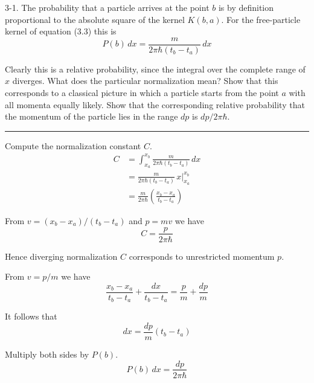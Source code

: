 \documentclass[12pt]{article}
\begin{document}
3-1.
The probability that a particle arrives at the point $b$
is by definition proportional to the absolute square of the kernel
$K(b,a)$.
For the free-particle kernel of equation (3.3) this is
\begin{equation*}
P(b)\,dx=\frac{m}{2\pi\hbar(t_b-t_a)}\,dx
\tag{3.6}
\end{equation*}

Clearly this is a relative probability, since the integral over the
complete range of $x$ diverges.
What does the particular normalization mean?
Show that this corresponds to a classical picture in which a particle
starts from the point $a$ with all momenta equally likely.
Show that the corresponding relative probability that the momentum
of the particle lies in the range $dp$ is $dp/2\pi\hbar$.

\bigskip
\hrule

\bigskip
Compute the normalization constant $C$.
\begin{align*}
C&=\int_{x_a}^{x_b}\frac{m}{2\pi\hbar(t_b-t_a)}\,dx
\\[1ex]
&=\frac{m}{2\pi\hbar(t_b-t_a)}\,x\big|_{x_a}^{x_b}
\\[1ex]
&=\frac{m}{2\pi\hbar}\left(\frac{x_b-x_a}{t_b-t_a}\right)
\end{align*}

From $v=(x_b-x_a)/(t_b-t_a)$ and $p=mv$ we have
\begin{equation*}
C=\frac{p}{2\pi\hbar}
\end{equation*}

\noindent
Hence diverging normalization $C$ corresponds to unrestricted momentum $p$.

\bigskip
\noindent
From $v=p/m$ we have
\begin{equation*}
\frac{x_b-x_a}{t_b-t_a}+\frac{dx}{t_b-t_a}=\frac{p}{m}+\frac{dp}{m}
\end{equation*}

\noindent
It follows that
\begin{equation*}
dx=\frac{dp}{m}(t_b-t_a)
\end{equation*}

\noindent
Multiply both sides by $P(b)$.
\begin{equation*}
P(b)\,dx=\frac{dp}{2\pi\hbar}
\end{equation*}
\end{document}
